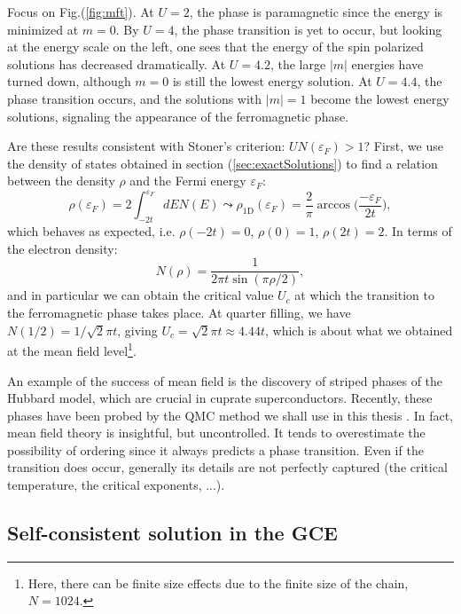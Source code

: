 Focus on Fig.(\ref{fig:mft}).
At $U = 2$, the phase is paramagnetic since the energy is minimized at $m = 0$. By $U = 4$, the phase transition is yet to occur, but looking at the energy scale on the left, one sees that the energy of the spin polarized solutions has decreased dramatically.
	At $U = 4.2$, the large $| m | $ energies have turned down, although $m = 0$ is still the lowest energy solution.
	At $U = 4.4$, the phase transition occurs, and the solutions with $| m | = 1$ become the lowest energy solutions, signaling the appearance of the ferromagnetic phase.

Are these results consistent with Stoner's criterion: $U N ( \varepsilon_F ) > 1$?
First, we use the density of states obtained in section (\ref{sec:exactSolutions}) to find a relation between the density $\rho$ and the Fermi energy $\varepsilon_F$:
\begin{equation}
\rho ( \varepsilon_F ) = 2 \int_{-2t}^{\varepsilon_F} dE N ( E ) \leadsto \rho_{\text{1D}} ( \varepsilon_F ) = \frac{2}{\pi} \arccos\bigg( \frac{-\varepsilon_F}{2t}\bigg) ,
\end{equation}
which behaves as expected, i.e. $\rho ( -2 t ) = 0$,  $\rho ( 0 ) = 1$, $\rho ( 2 t ) = 2$.
In terms of the electron density:
\begin{equation}
N ( \rho ) = \frac{1}{2\pi t \sin(\pi \rho / 2)} ,
\end{equation}
and in particular we can obtain the critical value $U_c$ at which the transition to the ferromagnetic phase takes place.
At quarter filling, we have $N( 1 / 2 ) = 1 /\sqrt{2} \pi t$, giving $U_c = \sqrt{2} \pi t \approx 4.44 t$, which is about what we obtained at the mean field level\footnote{Here, there can be finite size effects due to the finite size of the chain, $N = 1024$.}.

An example of the success of mean field is the discovery of striped phases of the Hubbard model, which are crucial in cuprate superconductors.
Recently, these phases have been probed by the \ac{QMC} method we shall use in this thesis \cite{huang_stripe_2018}.
In fact, mean field theory is insightful, but uncontrolled.
It tends to overestimate the possibility of ordering since it always predicts a phase transition.
Even if the transition does occur, generally its details are not perfectly captured (the critical temperature, the critical exponents, ...).

\subsection{Self-consistent solution in the \ac{GCE}}\label{subsec:selfconsistent}

